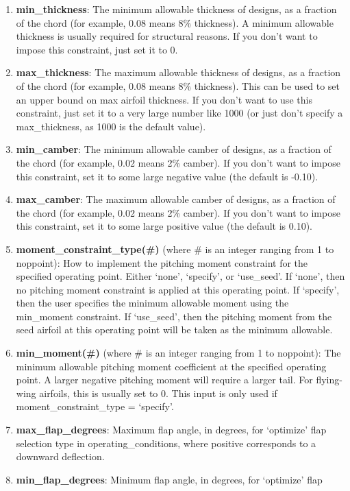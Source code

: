 \documentclass[11pt]{article}
\begin{document}
\begin{enumerate}
\item{\textbf{min\_thickness}: The minimum allowable thickness of designs, as a
fraction of the chord (for example, 0.08 means 8\% thickness).  A minimum allowable
thickness is usually required for structural reasons.  If you don't want to impose this
constraint, just set it to 0.}
\item{\textbf{max\_thickness}: The maximum allowable thickness of designs, as a
fraction of the chord (for example, 0.08 means 8\% thickness). This can be used to set an
upper bound on max airfoil thickness.  If you don't want to use this constraint, just set
it to a very large number like 1000 (or just don't specify a max\_thickness, as 1000 is
the default value).}
\item{\textbf{min\_camber}: The minimum allowable camber of designs, as a fraction of the
chord (for example, 0.02 means 2\% camber). If you don't want to impose this constraint,
set it to some large negative value (the default is -0.10).}
\item{\textbf{max\_camber}: The maximum allowable camber of designs, as a fraction of the
chord (for example, 0.02 means 2\% camber). If you don't want to impose this constraint,
set it to some large positive value (the default is 0.10).}
\item{\textbf{moment\_constraint\_type(\#)} (where \# is an integer ranging from 1 to
noppoint): How to implement the pitching moment constraint for the specified operating
point. Either `none', `specify', or `use\_seed'.  If `none', then no pitching moment 
constraint is applied at this operating point.  If `specify', then the user specifies the 
minimum allowable moment using the min\_moment constraint.  If `use\_seed', then the 
pitching moment from the seed airfoil at this operating point will be taken as the minimum
allowable.}
\item{\textbf{min\_moment(\#)} (where \# is an integer ranging from 1 to noppoint): The 
minimum allowable pitching moment coefficient at the specified operating point.  A larger
negative pitching moment will require a larger tail.  For flying-wing airfoils, this is 
usually set to 0.  This input is only used if moment\_constraint\_type = `specify'.} 
\item{\textbf{max\_flap\_degrees}: Maximum flap angle, in degrees, for `optimize' flap 
selection type in operating\_conditions, where positive corresponds to a downward
deflection.}
\item{\textbf{min\_flap\_degrees}: Minimum flap angle, in degrees, for `optimize' flap 
}
\end{enumerate}
\end{document}

